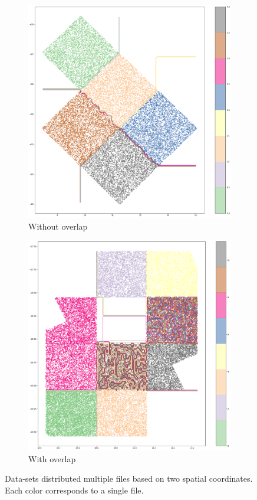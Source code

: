 \begin{figure}[htbp]
    \begin{subfigure}[]{0.5\textwidth}
    \includegraphics[width=\textwidth]{images/7_conclusions/tu_multifile_tree.png}
    \caption{Without overlap}\label{subfig:tu_multifile}
    \end{subfigure}
    \hfill
    \begin{subfigure}[]{0.5\textwidth}
    \includegraphics[width=\textwidth]{images/7_conclusions/mer_multifile_tree.png}
    \caption{With overlap}\label{subfig:mer_multifile}
    \end{subfigure}
    \caption{
        Data-sets distributed multiple files based on two spatial coordinates.
        Each color corresponds to a single file.
    }
    \label{fig:tree_cat_cut}
\end{figure}
